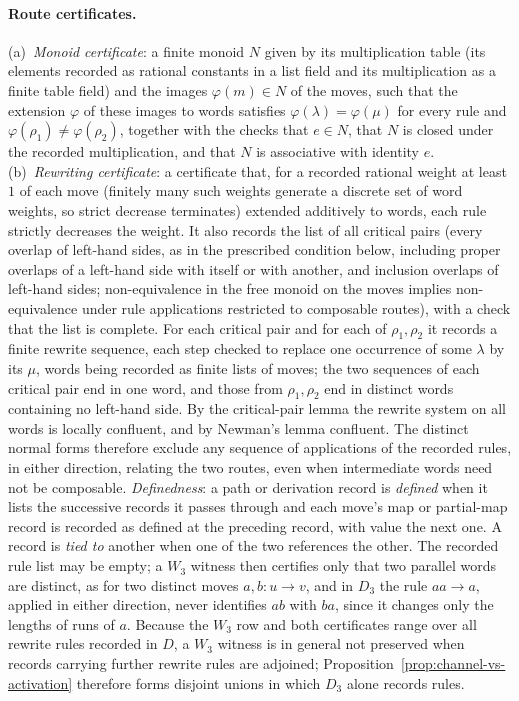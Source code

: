 \documentclass[11pt]{article}
\theoremstyle{definition}
\begin{document}
\paragraph{Route certificates.} (a)~\emph{Monoid certificate}: a finite monoid \(N\) given by its multiplication table (its elements recorded as rational constants in a list field and its multiplication as a finite table field) and the images \(\varphi(m)\in N\) of the moves, such that the extension \(\varphi\) of these images to words satisfies \(\varphi(\lambda)=\varphi(\mu)\) for every rule and \(\varphi(\rho_1)\neq\varphi(\rho_2)\), together with the checks that \(e\in N\), that \(N\) is closed under the recorded multiplication, and that \(N\) is associative with identity \(e\).
(b)~\emph{Rewriting certificate}: a certificate that, for a recorded rational weight at least \(1\) of each move (finitely many such weights generate a discrete set of word weights, so strict decrease terminates) extended additively to words, each rule strictly decreases the weight. It also records the list of all critical pairs (every overlap of left-hand sides, as in the prescribed condition below, including proper overlaps of a left-hand side with itself or with another, and inclusion overlaps of left-hand sides; non-equivalence in the free monoid on the moves implies non-equivalence under rule applications restricted to composable routes), with a check that the list is complete. For each critical pair and for each of \(\rho_1,\rho_2\) it records a finite rewrite sequence, each step checked to replace one occurrence of some \(\lambda\) by its \(\mu\), words being recorded as finite lists of moves; the two sequences of each critical pair end in one word, and those from \(\rho_1,\rho_2\) end in distinct words containing no left-hand side. By the critical-pair lemma the rewrite system on all words is locally confluent, and by Newman's lemma confluent. The distinct normal forms therefore exclude any sequence of applications of the recorded rules, in either direction, relating the two routes, even when intermediate words need not be composable.
\emph{Definedness}: a path or derivation record is \emph{defined} when it lists the successive records it passes through and each move's map or partial-map record is recorded as defined at the preceding record, with value the next one.
A record is \emph{tied to} another when one of the two references the other.
The recorded rule list may be empty; a \(W_3\) witness then certifies only that
two parallel words are distinct, as for two distinct moves \(a,b:u\to v\), and
in \(D_3\) the rule \(aa\to a\), applied in either direction, never identifies \(ab\) with \(ba\), since it changes only the lengths of runs of \(a\). Because the \(W_3\) row and both certificates range over all rewrite rules recorded in \(D\), a \(W_3\) witness is in general not preserved when records carrying further rewrite rules are adjoined; Proposition~\ref{prop:channel-vs-activation} therefore forms disjoint unions in which \(D_3\) alone records rules.
\end{document}
